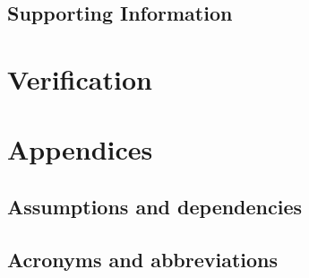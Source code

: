 \documentclass{scrreprt}
\begin{document}
\section{Supporting Information}


\chapter{Verification}


\chapter{Appendices}
\section{Assumptions and dependencies}


\section{Acronyms and abbreviations}
\end{document}
